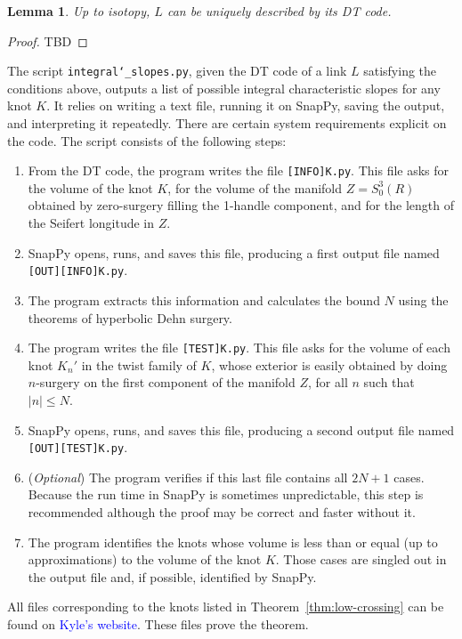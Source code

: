 \documentclass[11pt,usenames,dvipsnames,reqno]{amsart}
\numberwithin{theorem}{section}
\newtheorem{lemma}[theorem]{Lemma}
\theoremstyle{ex}
\theoremstyle{rem}
\def\kh#1{\textcolor{Blue}{#1}}
\begin{document}
\begin{lemma}
	Up to isotopy, $L$ can be uniquely described by its DT code.
\end{lemma}
\begin{proof}
	TBD
\end{proof}

The script \texttt{integral\char`_slopes.py}, given the DT code of a link $L$ satisfying the conditions above, outputs a list of possible integral characteristic slopes for any knot $K$. It relies on writing a text file, running it on SnapPy, saving the output, and interpreting it repeatedly. There are certain system requirements explicit on the code. The script consists of the following steps:

\begin{enumerate}
	\item From the DT code, the program writes the file \texttt{[INFO]K.py}. This file asks for the volume of the knot $K$, for the volume of the manifold $Z = S_0^3(R)$ obtained by zero-surgery filling the 1-handle component, and for the length of the Seifert longitude in $Z$.
	\item SnapPy opens, runs, and saves this file, producing a first output file named \texttt{[OUT][INFO]K.py}.
	\item The program extracts this information and calculates the bound $N$ using the theorems of hyperbolic Dehn surgery.
	\item The program writes the file \texttt{[TEST]K.py}. This file asks for the volume of each knot $K_{n}'$ in the twist family of $K$, whose exterior is easily obtained by doing $n$-surgery on the first component of the manifold $Z$, for all $n$ such that $|n| \leq N$.
	\item SnapPy opens, runs, and saves this file, producing a second output file named \texttt{[OUT][TEST]K.py}.
	\item (\textit{Optional}) The program verifies if this last file contains all $2 N + 1$ cases. Because the run time in SnapPy is sometimes unpredictable, this step is recommended although the proof may be correct and faster without it.
	\item The program identifies the knots whose volume is less than or equal (up to approximations) to the volume of the knot $K$. Those cases are singled out in the output file and, if possible, identified by SnapPy.
\end{enumerate}

All files corresponding to the knots listed in Theorem~\ref{thm:low-crossing} can be found on \kh{Kyle's website}. These files prove the theorem.
\end{document}
